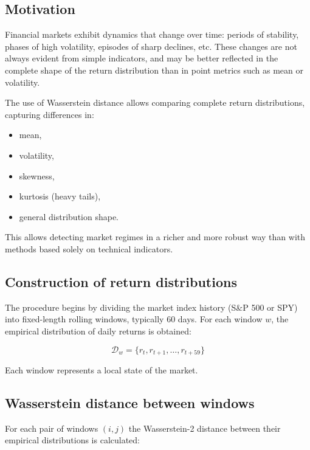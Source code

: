 \documentclass[12pt]{article}
\begin{document}
\subsection{Motivation}

Financial markets exhibit dynamics that change over time: periods of stability, phases of high volatility, episodes of sharp declines, etc. These changes are not always evident from simple indicators, and may be better reflected in the complete shape of the return distribution than in point metrics such as mean or volatility.

The use of Wasserstein distance allows comparing complete return distributions, capturing differences in:

\begin{itemize}
    \item mean,
    \item volatility,
    \item skewness,
    \item kurtosis (heavy tails),
    \item general distribution shape.
\end{itemize}

This allows detecting market regimes in a richer and more robust way than with methods based solely on technical indicators.

\subsection{Construction of return distributions}

The procedure begins by dividing the market index history (S\&P 500 or SPY) into fixed-length rolling windows, typically 60 days. For each window $w$, the empirical distribution of daily returns is obtained:



\[
\mathcal{D}_w = \{ r_{t}, r_{t+1}, \dots, r_{t+59} \}
\]



Each window represents a local state of the market.

\subsection{Wasserstein distance between windows}

For each pair of windows $(i, j)$ the Wasserstein-2 distance between their empirical distributions is calculated:
\end{document}
